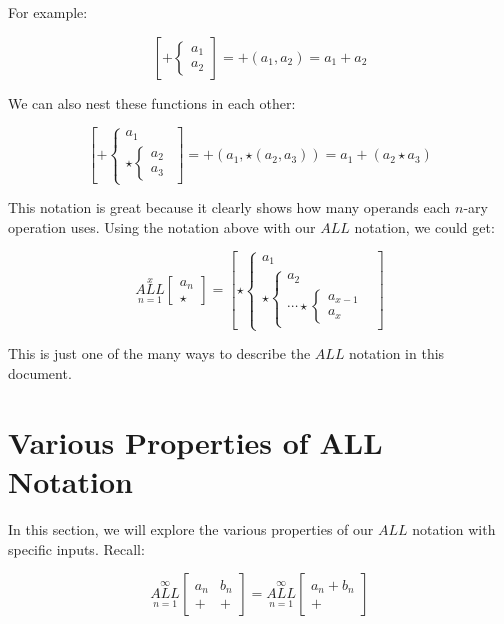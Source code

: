 \documentclass{article}
\begin{document}
For example:

$$\left[ + \left\{ \begin{array}{rcl}
a_1 \\ a_2 \end{array}\right. \right] = +(a_1,a_2)=a_1+a_2$$

We can also nest these functions in each other:

$$\left[ + \left\{ \begin{array}{rcl}
a_1 \\ \star \left\{  \begin{array} {rcl} a_2 \\ a_3\end{array} \right. \end{array}\right. \right] = +(a_1,\star(a_2,a_3))=a_1+(a_2 \star a_3)$$

This notation is great because it clearly shows how many operands each $n$-ary operation uses. Using the notation above with our $ALL$ notation, we could get:

$$\underset{n=1}{\overset{x}{ALL}} \begin{bmatrix}
a_n \\
\star
\end{bmatrix}=\left[ \star \left\{ \begin{array}{rcl}
a_1 \\ \star \left\{  \begin{array} {rcl} a_2 \\ \cdots  \star \left\{ \begin{array}{rcl}
a_{x-1} \\ a_x \end{array} \right. \end{array} \right. \end{array}\right. \right]$$

This is just one of the many ways to describe the $ALL$ notation in this document.

\section{Various Properties of ALL Notation}

In this section, we will explore the various properties of our $ALL$ notation with specific inputs.
Recall:

$$\underset{n=1}{\overset{\infty}{ALL}} \begin{bmatrix}
a_n & b_n \\
+& +
\end{bmatrix} = \underset{n=1}{\overset{\infty}{ALL}} \begin{bmatrix}
a_n + b_n \\
 +
\end{bmatrix}$$
\end{document}
